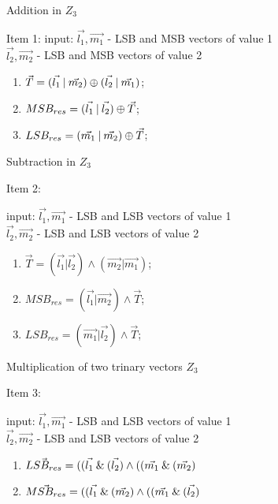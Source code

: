 \iffalse%
\begin{algorithm}
	\caption{Addition in $Z_3$}
		\label{alg:algpack1}  Item 1:
		input: $\vec{l_1}, \vec{m_1}$ - LSB and MSB vectors of value 1  \\
		  	  	$\vec{l_2}, \vec{m_2}$ - LSB and MSB vectors of value 2
		
\begin{enumerate}

	\item $\vec{T} = (\vec{l_1} \mathbin{|} \vec{m_2}) \oplus (\vec{l_2} \mathbin{|} \vec{m_1})$;
	\item $MSB_{res} = ( \vec{l_1} \mathbin{|} \vec{l_2} ) \oplus  \vec{T} $;
	\item $LSB_{res} = (\vec{m_1} \mathbin{|} \vec{m_2} ) \oplus \vec{T} $;
	
	\end{enumerate}
	
\end{algorithm}

\begin{algorithm}
		\caption{Subtraction in $Z_3$}
		\label{alg:algpack2} Item 2:

	
		input: $\vec{l_1}, \vec{m_1}$ - LSB and LSB vectors of value 1  \\
                  $\vec{l_2}, \vec{m_2}$ - LSB and LSB vectors of value 2
                  
\begin{enumerate}

	\item $\vec{T} = (\vec{l_1} | \vec{l_2}) \land (\vec{m_2} | \vec{m_1})$;
	\item $MSB_{res} = (\vec{l_1} | \vec{m_2} ) \land \vec{T}$;
    \item $LSB_{res} = (\vec{m_1} | \vec{l_2} ) \land \vec{T}$;
\end{enumerate}
	
	\end{algorithm}



\begin{algorithm}
			\caption{Multiplication of two trinary vectors $Z_3$}
		\label{alg:algpack3} Item 3:

		
				input: $\vec{l_1}, \vec{m_1}$ - LSB and LSB vectors of value 1  \\
		$\vec{l_2}, \vec{m_2}$ - LSB and LSB vectors of value 2
		
			\begin{enumerate}
	\item  $\vec{LSB_{res}} = ((\vec{l_1} \mathbin{\&} (\vec{l_2}) \land     ((\vec{m_1} \mathbin{\&} (\vec{m_2})       $
	\item	$\vec{MSB_{res}}= ((\vec{l_1} \mathbin{\&} (\vec{m_2}) \land     ((\vec{m_1} \mathbin{\&} (\vec{l_2})       $

	\end{enumerate}
		
	\end{algorithm}

